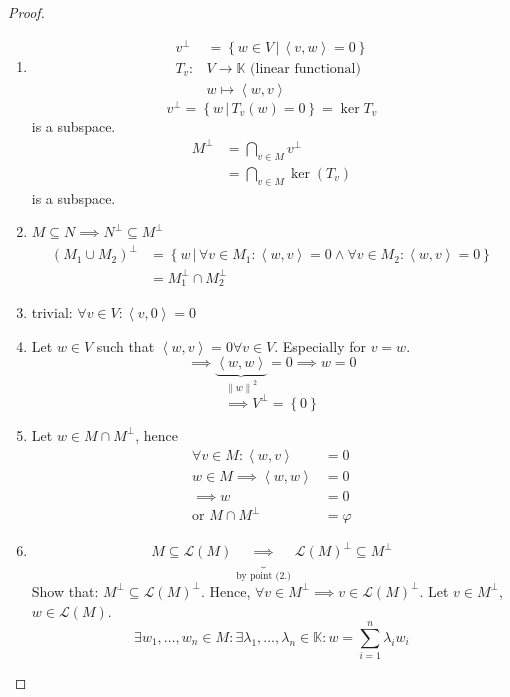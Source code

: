\documentclass{article}
\numberwithin{lecref}{section}
\newcommand{\set}[1]{\left\{#1\right\}}
\newcommand{\setdef}[2]{\left\{\left.#1\,\right|\,#2\right\}}
\newcommand{\ip}[2]{\left\langle#1,#2\right\rangle} %
\newcommand{\norm}[1]{\left\|#1\right\|}
\begin{document}
\begin{proof}
  \begin{enumerate}
    \item
      \begin{align*}
        v^\bot &= \setdef{w \in V}{\ip vw = 0} \\
          T_v: & V \to \mathbb K \text{ (linear functional)} \\
               & w \mapsto \ip wv
      \end{align*}
      \[ v^\bot = \setdef{w}{T_v(w) = 0} = \ker{T_v} \]
      is a subspace.
      \begin{align*}
        M^\bot &= \bigcap_{v \in M} v^\bot \\
               &= \bigcap_{v \in M} \ker(T_v)
      \end{align*}
      is a subspace.
    \item
      $M \subseteq N \implies N^\bot \subseteq M^\bot$
      \begin{align*}
        (M_1 \cup M_2)^\bot
          &= \setdef{w}{\forall v \in M_1: \ip wv = 0 \land \forall v \in M_2: \ip wv = 0} \\
          &= M_1^\bot \cap M_2^\bot
      \end{align*}
    \item trivial: $\forall v \in V: \ip v0 = 0$
    \item Let $w \in V$ such that $\ip wv = 0 \forall v \in V$. Especially for $v = w$.
      \[ \implies \underbrace{\ip ww}_{\norm{w}^2} = 0 \implies w = 0 \]
      \[ \implies V^\bot = \set{0} \]
    \item
      Let $w \in M \cap M^\bot$, hence
      \begin{align*}
        \forall v \in M: \ip wv &= 0 \\
        w \in M \implies \ip ww &= 0 \\
        \implies w &= 0 \\
        \text{or } M \cap M^\bot &= \varphi
      \end{align*}
    \item
      \[ M \subseteq \mathcal L(M) \underbrace{\implies}_{\text{by point (2.)}} \mathcal L(M)^\bot \subseteq M^\bot \]
      Show that: $M^\bot \subseteq \mathcal L(M)^\bot$.
      Hence, $\forall v \in M^\bot \implies v \in \mathcal L(M)^\bot$.
      Let $v \in M^\bot$, $w \in \mathcal L(M)$.
      \[
        \exists w_1, \ldots, w_n \in M: \exists \lambda_1, \ldots, \lambda_n \in \mathbb K:
        w = \sum_{i=1}^n \lambda_i w_i
\]
\end{enumerate}
\end{proof}
\end{document}
